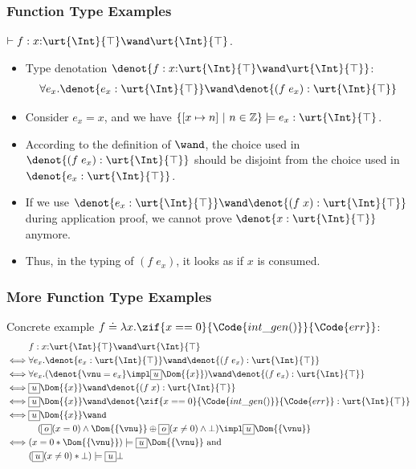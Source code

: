 \begin{frame}[fragile]
    \frametitle{Function Type Examples}

\begin{example} $\vdash f : x{:}\urt{\Int}{\top} \wand \urt{\Int}{\top}$.
\begin{itemize}
    \item Type denotation $\denot{f: x{:}\urt{\Int}{\top} \wand \urt{\Int}{\top}}$:
    \begin{align*}
        \forall e_x. \denot{e_x : \urt{\Int}{\top}} \wand \denot{(f\;e_x) : \urt{\Int}{\top}}
    \end{align*}
    \item Consider $e_x = x$, and we have $\{[x\mapsto n] ~|~ n \in \mathbb{Z} \} \models e_x : \urt{\Int}{\top}$. 
    \item According to the definition of $\wand$, the choice used in $\denot{(f\;e_x) : \urt{\Int}{\top}}$ should be disjoint from the choice used in $\denot{e_x : \urt{\Int}{\top}}$.
    \item If we use $\denot{e_x : \urt{\Int}{\top}} \wand \denot{(f\;x) : \urt{\Int}{\top}}$ during application proof, we cannot prove $\denot{x : \urt{\Int}{\top}}$ anymore.
    \item Thus, in the typing of $(f\;e_x)$, it looks as if $x$ is consumed.
\end{itemize}
\end{example}

\end{frame}

\begin{frame}[fragile]
    \frametitle{More Function Type Examples}

\begin{example}[Situation 1] Concrete example $f \doteq \lambda x. \zif{x == 0}{\Code{int\_gen()}}{\Code{err}}$:
    \begin{align*}
        &f : x{:}\urt{\Int}{\top} \wand \urt{\Int}{\top}
    \\ \iff &\forall e_x. \denot{e_x : \urt{\Int}{\top}} \wand \denot{(f\;e_x) : \urt{\Int}{\top}}
    \\ \iff &\forall e_x. (\denot{\vnu = e_x} \impl \supExt \Dom{\{x\}}) \wand \denot{(f\;e_x) : \urt{\Int}{\top}}
    \\ \iff &\supExt \Dom{\{x\}} \wand \denot{(f\;x) : \urt{\Int}{\top}}
    \\ \iff &\supExt \Dom{\{x\}} \wand \denot{\zif{x == 0}{\Code{int\_gen()}}{\Code{err}} : \urt{\Int}{\top}}
    \\ \iff &\supExt \Dom{\{x\}} \wand 
    \\ & \quad (\subExt (x = 0) \land \Dom{\{\vnu\}} \oplus  \subExt (x \neq 0) \land \bot) \impl \supExt \Dom{\{\vnu\}}
    \\ \iff &(x = 0 * \Dom{\{\vnu\}}) \models \supExt \Dom{\{\vnu\}} \text{ and } 
    \\ &(\supExt (x \neq 0) * \bot) \models \supExt \bot  
    \end{align*} 
\end{example}

\end{frame}

